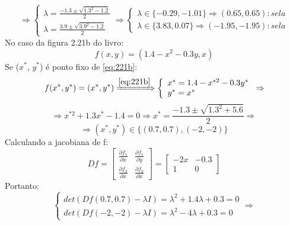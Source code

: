 \documentclass{article}[twocolumn]
\begin{document}
	\begin{equation}
		\Rightarrow
		\left\{\begin{array}{l}
			\lambda = \frac{-1.3 \pm \sqrt{1.3^{2} - 1.2}}{2}\\
			\lambda = \frac{3.9 \pm \sqrt{3.9^{2} - 1.2}}{2}
		\end{array}\right.
		\Rightarrow
		\left\{\begin{array}{l}
			\lambda \in \{-0.29, -1.01\} \Rightarrow (0.65, 0.65): sela\\
			\lambda \in \{3.83, 0.07\} \Rightarrow (-1.95, -1.95): sela
		\end{array}\right.
		\nonumber
	\end{equation}
	No caso da figura 2.21b do livro:
	\begin{equation}
		\label{eq:221b}
		f(x, y) = (1.4 - x^{2} - 0.3y, x)
	\end{equation}
	Se ($x^{*}$, $y^{*}$) \'e ponto fixo de \ref{eq:221b}:
	\begin{equation}
		f(x^{*}, y^{*}) = (x^{*}, y^{*}) \xRightarrow{\ref{eq:221b}}
		\left\{\begin{array}{l}
			x^{*} = 1.4 - x^{*2} - 0.3y^{*}\\
			y^{*} = x^{*}
		\end{array}\right. \Rightarrow
		\nonumber
	\end{equation}
	\begin{equation}
		\Rightarrow x^{*2} + 1.3x^{*} - 1.4 = 0
		\Rightarrow x^{*} = \frac{-1.3 \pm \sqrt{1.3^{2} + 5.6}}{2} \Rightarrow
		\nonumber
	\end{equation}
	\begin{equation}
		\Rightarrow (x^{*}, y^{*}) \in \{(0.7, 0.7), (-2, -2)\}
		\nonumber
	\end{equation}
	Calculando a jacobiana de f:
	\begin{equation}
		Df = \left[\begin{array}{cc}
			\frac{\partial f_{1}}{\partial x} & \frac{\partial f_{1}}{\partial y}\\
			\frac{\partial f_{2}}{\partial x} & \frac{\partial f_{2}}{\partial x}
		\end{array}\right]
		= \left[\begin{array}{cc}
			-2x & -0.3\\
			1 & 0
		\end{array}\right]
		\nonumber
	\end{equation}
	Portanto:
	\begin{equation}
		\left\{\begin{array}{l}
			det(Df(0.7, 0.7) - \lambda I) = \lambda^{2} + 1.4\lambda + 0.3 = 0\\
			det(Df(-2, -2) - \lambda I) = \lambda^{2} - 4\lambda + 0.3 = 0
		\end{array}\right. \Rightarrow
		\nonumber
	\end{equation}
\end{document}
